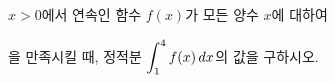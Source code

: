 $x>0$에서 연속인 함수 $f(x)$가 모든 양수 $x$에 대하여 \par\smallskip{}\par\smallskip\noindent 을 만족시킬 때, 정적분 $\displaystyle\int_{1}^{4}f(x)\mkern3mu dx$의 값을 구하시오.
